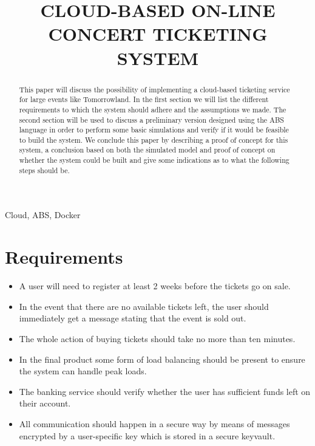 \documentclass[conference]{IEEEtran}
\begin{document}
\title{CLOUD-BASED ON-LINE CONCERT TICKETING SYSTEM}

\author{
}

\maketitle

\begin{abstract}
This paper will discuss the possibility of implementing a cloud-based ticketing service for large events like Tomorrowland. In the first section we will list the different requirements to which the system should adhere and the assumptions we made. The second section will be used to discuss a preliminary version designed using the ABS language in order to perform some basic simulations and verify if it would be feasible to build the system. We conclude this paper by describing a proof of concept for this system, a conclusion based on both the simulated model and proof of concept on whether the system could be built and give some indications as to what the following steps should be.
\end{abstract}

\begin{IEEEkeywords}
Cloud, ABS, Docker
\end{IEEEkeywords}

\section*{Requirements}
\begin{itemize}
	\item A user will need to register at least 2 weeks before the tickets go on sale.
	\item In the event that there are no available tickets left, the user should immediately get a message stating that the event is sold out.
	\item The whole action of buying tickets should take no more than ten minutes.
	\item In the final product some form of load balancing should be present to ensure the system can handle peak loads.
	\item The banking service should verify whether the user has sufficient funds left on their account.
	\item All communication should happen in a secure way by means of messages encrypted by a user-specific key which is stored in a secure keyvault.
	\end{itemize}
\end{document}
